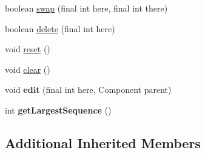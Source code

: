 \begin{DoxyCompactItemize}
\item 
boolean \hyperlink{classgov_1_1fnal_1_1ppd_1_1dd_1_1channel_1_1list_1_1table_1_1SelectedChannelsTableModel_a425682e41f6884211eeb8ac282aa20f6}{swap} (final int here, final int there)
\item 
boolean \hyperlink{classgov_1_1fnal_1_1ppd_1_1dd_1_1channel_1_1list_1_1table_1_1SelectedChannelsTableModel_ae93a046a5d3de36330302e02eb77e268}{delete} (final int here)
\item 
void \hyperlink{classgov_1_1fnal_1_1ppd_1_1dd_1_1channel_1_1list_1_1table_1_1SelectedChannelsTableModel_a18eb0afcee7ec9e06cab673fc5a9e83b}{reset} ()
\item 
void \hyperlink{classgov_1_1fnal_1_1ppd_1_1dd_1_1channel_1_1list_1_1table_1_1SelectedChannelsTableModel_a4827bcdd9d9c6287a9cde8abec7cb082}{clear} ()
\item 
\hypertarget{classgov_1_1fnal_1_1ppd_1_1dd_1_1channel_1_1list_1_1table_1_1SelectedChannelsTableModel_a260df7c33ba7603f5b61de9fd6460a96}{void {\bfseries edit} (final int here, Component parent)}\label{classgov_1_1fnal_1_1ppd_1_1dd_1_1channel_1_1list_1_1table_1_1SelectedChannelsTableModel_a260df7c33ba7603f5b61de9fd6460a96}

\item 
\hypertarget{classgov_1_1fnal_1_1ppd_1_1dd_1_1channel_1_1list_1_1table_1_1SelectedChannelsTableModel_a587affc6a89dab0a167a6eba68623314}{int {\bfseries get\-Largest\-Sequence} ()}\label{classgov_1_1fnal_1_1ppd_1_1dd_1_1channel_1_1list_1_1table_1_1SelectedChannelsTableModel_a587affc6a89dab0a167a6eba68623314}

\end{DoxyCompactItemize}
\subsection*{Additional Inherited Members}


